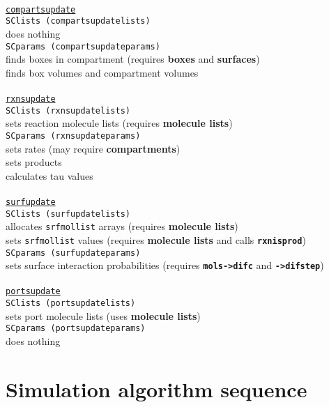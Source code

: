 \documentclass {book}
\begin{document}
\begin{tabbing}
\>\\
\>\texttt{\underline{compartsupdate}}\\
\>\>\texttt{SClists (compartsupdatelists)}\\
\>\>\>does nothing\\
\>\>\texttt{SCparams (compartsupdateparams)}\\
\>\>\>finds boxes in compartment (requires \textbf{boxes} and \textbf{surfaces})\\
\>\>\>finds box volumes and compartment volumes\\
\>\\
\>\texttt{\underline{rxnsupdate}}\\
\>\>\texttt{SClists (rxnsupdatelists)}\\
\>\>\>sets reaction molecule lists (requires \textbf{molecule lists})\\
\>\>\texttt{SCparams (rxnsupdateparams)}\\
\>\>\>sets rates (may require \textbf{compartments})\\
\>\>\>sets products\\
\>\>\>calculates tau values\\
\>\\
\>\texttt{\underline{surfupdate}}\\
\>\>\texttt{SClists (surfupdatelists)}\\
\>\>\>allocates \texttt{srfmollist} arrays (requires \textbf{molecule lists})\\
\>\>\>sets \texttt{srfmollist} values (requires \textbf{molecule lists} and calls \texttt{\textbf{rxnisprod}})\\
\>\>\texttt{SCparams (surfupdateparams)}\\
\>\>\>sets surface interaction probabilities (requires \texttt{\textbf{mols->difc}} and \texttt{\textbf{->difstep}})\\
\>\\
\>\texttt{\underline{portsupdate}}\\
\>\>\texttt{SClists (portsupdatelists)}\\
\>\>\>sets port molecule lists (uses \textbf{molecule lists})\\
\>\>\texttt{SCparams (portsupdateparams)}\\
\>\>\>does nothing\\
\end{tabbing}

\section{Simulation algorithm sequence}
\end{document}
